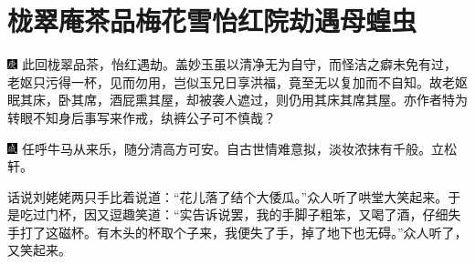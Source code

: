 

\chapter{栊翠庵茶品梅花雪\hspace{.5em}怡红院劫遇母蝗虫}

{\includegraphics[width=3mm]{../Images/00004} \kaishu 此回栊翠品茶，怡红遇劫。盖妙玉虽以清净无为自守，而怪洁之癖未免有过，老妪只污得一杯，见而勿用，岂似玉兄日享洪福，竟至无以复加而不自知。故老妪眠其床，卧其席，酒屁熏其屋，却被袭人遮过，则仍用其床其席其屋。亦作者特为转眼不知身后事写来作戒，纨裤公子可不慎哉？}

{\includegraphics[width=3mm]{../Images/00005} \kaishu 任呼牛马从来乐，随分清高方可安。自古世情难意拟，淡妆浓抹有千般。立松轩。}

话说刘姥姥两只手比着说道：``花儿落了结个大倭瓜。''众人听了哄堂大笑起来。于是吃过门杯，因又逗趣笑道：``实告诉说罢，我的手脚子粗笨，又喝了酒，仔细失手打了这磁杯。有木头的杯取个子来，我便失了手，掉了地下也无碍。''众人听了，又笑起来。

